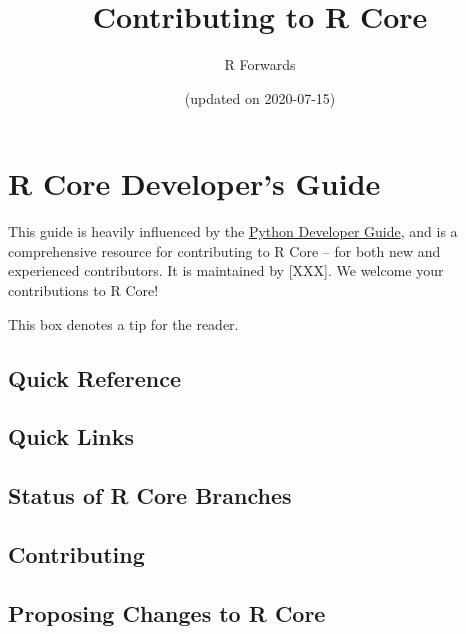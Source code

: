 \documentclass[]{book}
\title{Contributing to R Core}
\author{R Forwards}
\date{(updated on 2020-07-15)}
\begin{document}
\maketitle

{
\setcounter{tocdepth}{1}
\tableofcontents
}
\hypertarget{section}{%
\chapter*{}\label{section}}

\hypertarget{r-core-developers-guide}{%
\chapter{R Core Developer's Guide}\label{r-core-developers-guide}}

This guide is heavily influenced by the \href{https://devguide.python.org/appendix/\#basics-for-contributors}{Python Developer Guide}, and is a comprehensive resource for contributing to R Core -- for both new and experienced contributors. It is maintained by {[}XXX{]}. We welcome your contributions to R Core!

This box denotes a tip for the reader.

\hypertarget{quick-reference}{%
\section{Quick Reference}\label{quick-reference}}

\hypertarget{quick-links}{%
\section{Quick Links}\label{quick-links}}

\hypertarget{status-of-r-core-branches}{%
\section{Status of R Core Branches}\label{status-of-r-core-branches}}

\hypertarget{contributing}{%
\section{Contributing}\label{contributing}}

\hypertarget{proposing-changes-to-r-core}{%
\section{Proposing Changes to R Core}\label{proposing-changes-to-r-core}}
\end{document}
